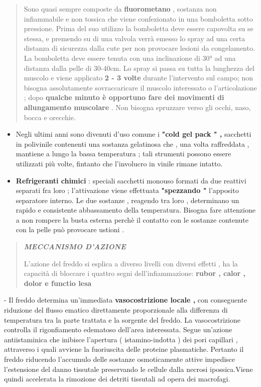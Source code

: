 \documentclass[]{article}
\begin{document}
\begin{quote}
Sono quasi sempre composte da \textbf{fluorometano} , sostanza non
infiammabile e non tossica che viene confezionato in una bomboletta
sotto pressione. Prima del suo utilizzo la bomboletta deve essere
capovolta su se stessa, e premendo su di una valvola verrà emesso lo
spray ad una certa distanza di sicurezza dalla cute per non provocare
lesioni da congelamento. La bomboletta deve essere tenuta con una
inclinazione di 30° ad una distanza dalla pelle di 30-40cm. Lo spray si
passa su tutta la lunghezza del muscolo e viene applicato \textbf{2 - 3
volte} durante l'intervento sul campo; non bisogna assolutamente
sovraccaricare il muscolo interessato o l'articolazione ; dopo
\textbf{qualche minuto è opportuno fare dei movimenti di allungamento
muscolare} . Non bisogna spruzzare verso gli occhi, naso, bocca e
orecchie.
\end{quote}

\begin{itemize}
\item
  Negli ultimi anni sono divenuti d'uso comune i \textbf{"cold gel pack
  " ,} sacchetti in polivinile contenenti una sostanza gelatinosa che ,
  una volta raffreddata , mantiene a lungo la bassa temperatura ; tali
  strumenti possono essere utilizzati più volte, fintanto che
  l'involucro in vinile rimane intatto.
\item
  \textbf{Refrigeranti chimici} : speciali sacchetti monouso formati da
  due reattivi separati fra loro ; l'attivazione viene effettuata
  \textbf{"spezzando "} l'apposito separatore interno. Le due sostanze ,
  reagendo tra loro , determinano un rapido e consistente abbassamento
  della temperatura. Bisogna fare attenzione a non rompere la busta
  esterna perchè il contatto con le sostanze contenute con la pelle può
  provocare ustioni .
\end{itemize}

\begin{quote}
\textbf{\emph{MECCANISMO D'AZIONE }}

L'azione del freddo si esplica a diverso livelli con diversi effetti ,
ha la capacità di bloccare i quattro segni dell'infiammazione:
\textbf{rubor , calor , dolor e functio lesa}
\end{quote}

- Il freddo determina un'immediata \textbf{vasocostrizione locale ,} con
conseguente riduzione del flusso ematico direttamente proporzionale alla
differenza di temperatura tra la parte trattata e la sorgente del
freddo. La vasocostrizione controlla il rigonfiamento edematoso
dell'area interessata. Segue un'azione antiistaminica che inibisce
l'apertura ( istamino-indotta ) dei pori capillari , attraverso i quali
avviene la fuoriuscita delle proteine plasmatiche. Pertanto il freddo
riducendo l'accumulo delle sostanze osmoticamente attive impedisce
l'estensione del danno tissutale preservando le cellule dalla necrosi
ipossica.Viene quindi accelerata la rimozione dei detriti tissutali ad
opera dei macrofagi.
\end{document}
